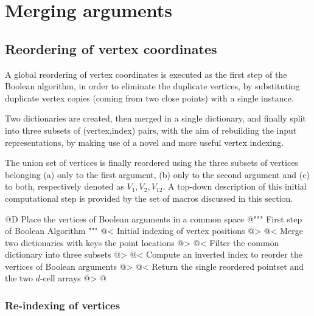 \documentclass[11pt,oneside]{article}	%
\begin{document}
\section{Merging arguments}

\subsection{Reordering of vertex coordinates}
A global reordering of vertex coordinates is executed as the first step of the Boolean algorithm, in order to eliminate the duplicate vertices, by substituting duplicate vertex copies (coming from two close points) with a single instance. 

Two dictionaries are created, then merged in a single dictionary, and finally split into three subsets of (vertex,index) pairs, with the aim of rebuilding the input representations, by making use of a novel and more useful vertex indexing.

The union set of vertices is finally reordered using the three subsets of vertices belonging (a) only to the first argument, (b) only to the second argument and (c) to both, respectively denoted as $V_1, V_2, V_{12}$. A top-down description of this initial computational step is provided by the set of macros discussed in this section.

@D Place the vertices of Boolean arguments in a common space
@{""" First step of Boolean Algorithm """
@< Initial indexing of vertex positions @>
@< Merge two dictionaries with keys the point locations @>
@< Filter the common dictionary into three subsets @>
@< Compute an inverted index to reorder the vertices of Boolean arguments @>
@< Return the single reordered pointset and the two $d$-cell arrays @>
@}

\subsubsection{Re-indexing of vertices}
\end{document}
